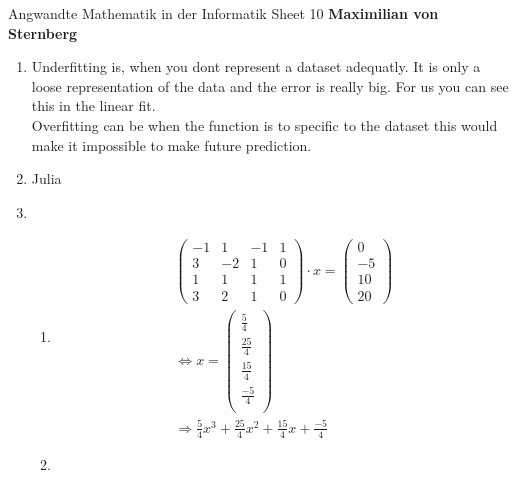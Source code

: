 \documentclass[]{book}
\theoremstyle{definition}
\begin{document}
\begin{center}
{\Large Angwandte Mathematik in der Informatik \hspace{0.5cm} Sheet 10}
\textbf{Maximilian von Sternberg} %
\end{center}

\vspace{0.2 cm}

\begin{enumerate}
    \item Underfitting is, when you dont represent a dataset adequatly. It is only a loose representation of the data and the error is really big. For us you can see this in the linear fit. \\ Overfitting can be when the function is to specific to the dataset this would make it impossible to make future prediction. 
    \item Julia
    \item \begin{enumerate}
        \item \begin{align*}
            \begin{pmatrix}
                -1 & 1 & -1 & 1 \\
                3 & -2 & 1 & 0 \\
                1 & 1 & 1 & 1 \\
                3 & 2 & 1 & 0 
            \end{pmatrix}
            \cdot x = \begin{pmatrix}
                0 \\ 
                -5 \\
                10 \\
                20
            \end{pmatrix}\\
            \Leftrightarrow x = \begin{pmatrix}
                \frac{5}{4} \\
                \frac{25}{4} \\
                \frac{15}{4} \\
                \frac{-5}{4} \\
            \end{pmatrix}
            \\
            \Rightarrow \frac{5}{4}x^3 + \frac{25}{4}x^2 +\frac{15}{4}x +\frac{-5}{4}
        \end{align*}
        \item \begin{align*}

\end{align*}
\end{enumerate}
\end{enumerate}
\end{document}
